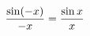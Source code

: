 \documentclass[preview]{standalone}
\begin{document}
\begin{align*}
\special{dvisvgm:raw <g id='unique000'>}\frac{\sin(-x)}{-x}=\frac{\sin x}{x}\special{dvisvgm:raw </g>}
\end{align*}
\end{document}
